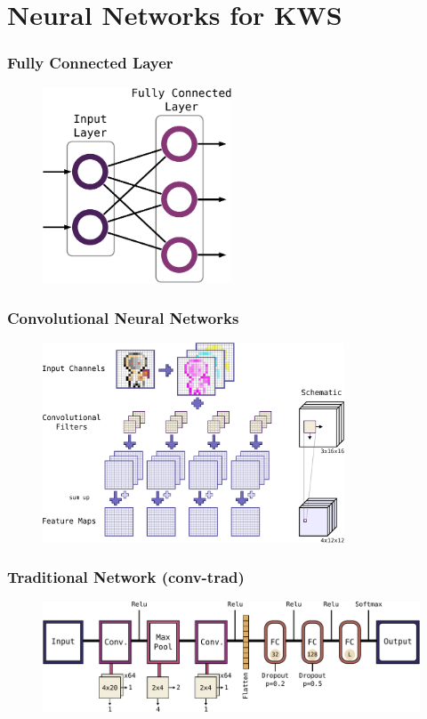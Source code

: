 
\section{Neural Networks for KWS}

\begin{frame}
  \frametitle{Fully Connected Layer}
  \begin{figure} \includegraphics[width=0.5\textwidth]{../4_nn/figs/nn_theory_fc.pdf} \end{figure}
\end{frame}

\begin{frame}
  \frametitle{Convolutional Neural Networks}
  \begin{figure} \includegraphics[width=0.8\textwidth]{../4_nn/figs/nn_theory_cnn_basics.pdf} \end{figure}
\end{frame}

\begin{frame}
  \frametitle{Traditional Network (conv-trad)}
  \begin{figure} \includegraphics[width=1.0\textwidth]{../4_nn/figs/nn_arch_cnn_trad.pdf} \end{figure}
\end{frame}

